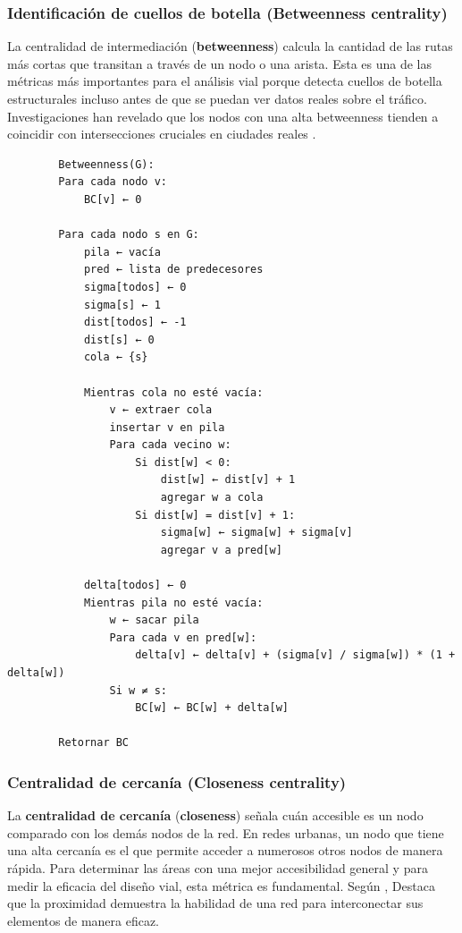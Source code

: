 \subsubsection{Identificación de cuellos de botella (Betweenness centrality)}
La centralidad de intermediación (\textbf{betweenness}) calcula la cantidad de las rutas más cortas que transitan a través de un nodo o una arista. Esta es una de las 
métricas más importantes para el análisis vial porque detecta cuellos de botella estructurales incluso antes de que se puedan ver datos reales sobre el tráfico. Investigaciones 
han revelado que los nodos con una alta betweenness tienden a coincidir con intersecciones cruciales en ciudades reales \cite{crucitti_centrality_2006}.

\begin{listing}[H]
    \caption{Pseudocodigo del algoritmo de identificación de cuellos de botella}
    \label{lst:betweenness-centrality}
    \begin{verbatim}
        Betweenness(G):
        Para cada nodo v:
            BC[v] ← 0

        Para cada nodo s en G:
            pila ← vacía
            pred ← lista de predecesores
            sigma[todos] ← 0
            sigma[s] ← 1
            dist[todos] ← -1
            dist[s] ← 0
            cola ← {s}

            Mientras cola no esté vacía:
                v ← extraer cola
                insertar v en pila
                Para cada vecino w:
                    Si dist[w] < 0:
                        dist[w] ← dist[v] + 1
                        agregar w a cola
                    Si dist[w] = dist[v] + 1:
                        sigma[w] ← sigma[w] + sigma[v]
                        agregar v a pred[w]

            delta[todos] ← 0
            Mientras pila no esté vacía:
                w ← sacar pila
                Para cada v en pred[w]:
                    delta[v] ← delta[v] + (sigma[v] / sigma[w]) * (1 + delta[w])
                Si w ≠ s:
                    BC[w] ← BC[w] + delta[w]

        Retornar BC
    \end{verbatim}
\end{listing}

\subsubsection{Centralidad de cercanía (Closeness centrality)}
La \textbf{centralidad de cercanía} (\textbf{closeness}) señala cuán accesible es un nodo comparado con los demás nodos de la red. En redes urbanas, un nodo que tiene una alta cercanía es el 
que permite acceder a numerosos otros nodos de manera rápida. Para determinar las áreas con una mejor accesibilidad general y para medir la eficacia del diseño vial, esta 
métrica es fundamental. Según \cite{barthelemy_spatial_2011}, Destaca que la proximidad demuestra la habilidad de una red para interconectar sus elementos de manera eficaz.

